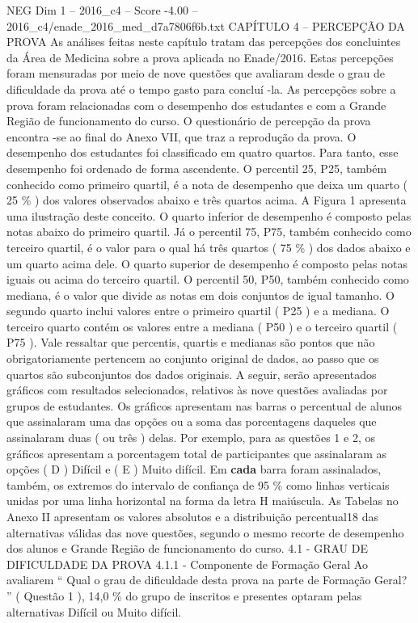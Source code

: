 \begin{textsample}{NEG Dim 1 – 2016\_c4 – Score -4.00 – 2016\_c4/enade\_2016\_med\_d7a7806f6b.txt}  \label{ex:f1_neg_156}
CAPÍTULO 4 – PERCEPÇÃO DA PROVA As análises feitas neste capítulo tratam das percepções dos concluintes da Área de Medicina sobre a prova aplicada no Enade/2016.
Estas percepções foram mensuradas por meio de nove questões que avaliaram desde o grau de dificuldade da prova até o tempo gasto para concluí -la.
As percepções sobre a prova foram relacionadas com o desempenho dos estudantes e com a Grande Região de funcionamento do curso.
O questionário de percepção da prova encontra -se ao final do Anexo VII, que traz a reprodução da prova.
O desempenho dos estudantes foi classificado em quatro quartos.
Para tanto, esse desempenho foi ordenado de forma ascendente.
O percentil 25, P25, também conhecido como primeiro quartil, é a nota de desempenho que deixa um quarto ( 25 \% ) dos valores observados abaixo e três quartos acima.
A Figura 1 apresenta uma ilustração deste conceito.
O quarto inferior de desempenho é composto pelas notas abaixo do primeiro quartil.
Já o percentil 75, P75, também conhecido como terceiro quartil, é o valor para o qual há três quartos ( 75 \% ) dos dados abaixo e um quarto acima dele.
O quarto superior de desempenho é composto pelas notas iguais ou acima do terceiro quartil.
O percentil 50, P50, também conhecido como mediana, é o valor que divide as notas em dois conjuntos de igual tamanho.
O segundo quarto inclui valores entre o primeiro quartil ( P25 ) e a mediana.
O terceiro quarto contém os valores entre a mediana ( P50 ) e o terceiro quartil ( P75 ).
Vale ressaltar que percentis, quartis e medianas são pontos que não obrigatoriamente pertencem ao conjunto original de dados, ao passo que os quartos são subconjuntos dos dados originais.
A seguir, serão apresentados gráficos com resultados selecionados, relativos às nove questões avaliadas por grupos de estudantes.
Os gráficos apresentam nas barras o percentual de alunos que assinalaram uma das opções ou a soma das porcentagens daqueles que assinalaram duas ( ou três ) delas.
Por exemplo, para as questões 1 e 2, os gráficos apresentam a porcentagem total de participantes que assinalaram as opções ( D ) Difícil e ( E ) Muito difícil.
Em \textbf{cada} barra foram assinalados, também, os extremos do intervalo de confiança de 95 \% como linhas verticais unidas por uma linha horizontal na forma da letra H maiúscula.
As Tabelas no Anexo II apresentam os valores absolutos e a distribuição percentual18 das alternativas válidas das nove questões, segundo o mesmo recorte de desempenho dos alunos e Grande Região de funcionamento do curso. 4.1 - GRAU DE DIFICULDADE DA PROVA 4.1.1 - Componente de Formação Geral Ao avaliarem “ Qual o grau de dificuldade desta prova na parte de Formação Geral? ” ( Questão 1 ), 14,0 \% do grupo de inscritos e presentes optaram pelas alternativas Difícil ou Muito difícil.

\end{textsample}
